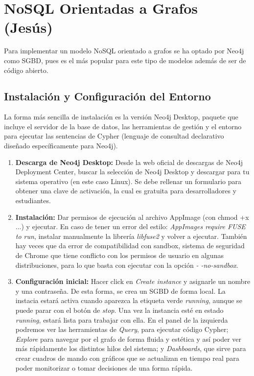 \chapter{NoSQL Orientadas a Grafos (Jesús)}
\label{ch:jesus}

Para implementar un modelo NoSQL orientado a grafos se ha optado por Neo4j como SGBD, pues es el más popular para este tipo de modelos además de ser de código abierto.

\section{Instalación y Configuración del Entorno}

La forma más sencilla de instalación es la versión Neo4j Desktop, paquete que incluye el servidor de la base de datos, las herramientas de gestión y el entorno para ejecutar las sentencias de Cypher (lenguaje de consultad declarativo diseñado específicamente para Neo4j).

\begin{enumerate}
    \item \textbf{Descarga de Neo4j Desktop:} Desde la web oficial de descargas de Neo4j Deployment Center, buscar la selección de Neo4j Desktop y descargar para tu sistema operativo (en este caso Linux). Se debe rellenar un formulario para obtener una clave de activación, la cual es gratuita para desarrolladores y estudiantes.
    \item \textbf{Instalación:} Dar permisos de ejecución al archivo AppImage (con chmod +x ...) y ejecutar. En caso de tener un error del estilo: \textit{AppImages require FUSE to run}, instalar manualmente la librería \textit{libfuse2} y volver a ejecutar. También hay veces que da error de compatibilidad con sandbox, sistema de seguridad de Chrome que tiene conflicto con los permisos de usuario en algunas distribuciones, para lo que basta con ejecutar con la opción \textit{- -no-sandbox}.
    \item \textbf{Configuración inicial:} Hacer click en \textit{Create instance} y asignarle un nombre y una contraseña. De esta forma, se crea un SGBD de forma local. La instacia estará activa cuando aparezca la etiqueta verde \textit{running}, aunque se puede parar con el botón de \textit{stop}. Una vez la instancia esté en estado \textit{running}, estará lista para trabajar con ella. En el panel de la izquierda podremos ver las herramientas de \textit{Query}, para ejecutar código Cypher; \textit{Explore} para navegar por el grafo de forma fluida y estética y así poder ver más rápidamente los distintos hilos del sistema; y \textit{Dashboards}, que sirve para crear cuadros de mando con gráficos que se actualizan en tiempo real para poder monitorizar o tomar decisiones de una forma rápida.
\end{enumerate}

